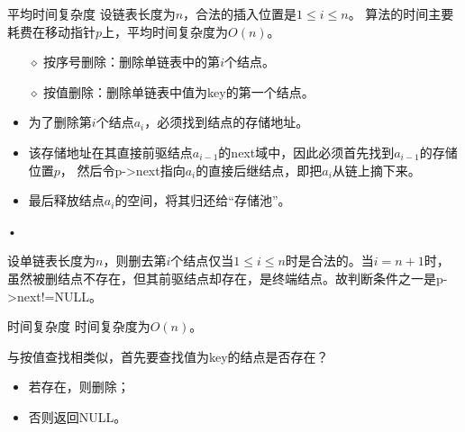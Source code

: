 \begin{frame}[fragile]
 
\pause
\begin{block}{平均时间复杂度}
设链表长度为$n$，合法的插入位置是$1\le i \le n$。
算法的时间主要耗费在移动指针$p$上，平均时间复杂度为$O(n)$。
\end{block}

\end{frame}


\begin{frame}
\begin{itemize}
\item[$\diamond$]
按序号删除：删除单链表中的第$i$个结点。\\[0.2in]
\item[$\diamond$]
按值删除：删除单链表中值为key的第一个结点。
\end{itemize}
\end{frame}


\begin{frame}
 \begin{itemize}
\item 为了删除第$i$个结点$a_i$，必须找到结点的存储地址。
\item 该存储地址在其直接前驱结点$a_{i-1}$的next域中，因此必须首先找到$a_{i-1}$的存储位置$p$，
然后令p-\textgreater next指向$a_i$的直接后继结点，即把$a_i$从链上摘下来。
\item
最后释放结点$a_i$的空间，将其归还给“存储池”。
\end{itemize}•
 
 
 设单链表长度为$n$，则删去第$i$个结点仅当$1\le i \le n$时是合法的。当$i=n+1$时，虽然被删结点不存在，但其前驱结点却存在，是终端结点。故判断条件之一是p-\textgreater next!=NULL。
 
\end{frame}

\begin{frame}[fragile]
 
\pause
\begin{block}{时间复杂度}
时间复杂度为$O(n)$。
\end{block}

\end{frame}


\begin{frame}

 
与按值查找相类似，首先要查找值为key的结点是否存在？
\begin{itemize}
\item 若存在，则删除；
\item 否则返回NULL。
\end{itemize}

\end{frame}

